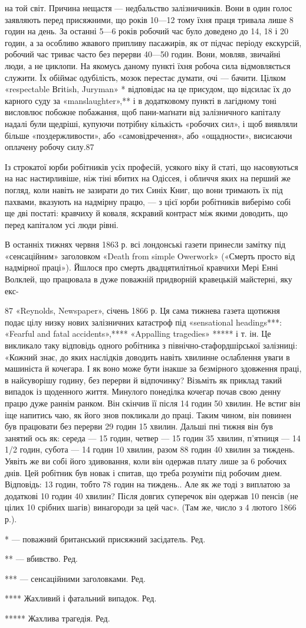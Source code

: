 на той світ. Причина нещастя — недбальство залізничників. Вони
в один голос заявляють перед присяжними, що років 10—12 тому
їхня праця тривала лише 8 годин на день. За останні 5—6 років
робочий час було доведено до 14, 18 і 20 годин, а за особливо
жвавого припливу пасажирів, як от підчас періоду екскурсій,
робочий час триває часто без перерви 40—50 годин. Вони, мовляв,
звичайні люди, а не циклопи. На якомусь даному пункті
їхня робоча сила відмовляється служити. Їх обіймає одубілість,
мозок перестає думати, очі — бачити. Цілком «respectable Вгіtish,
Juryman» * відповідає на це присудом, що відсилає їх до
карного суду за «manslaughter»,** і в додатковому пункті в лагідному
тоні висловлює побожне побажання, щоб пани-маґнати
від залізничного капіталу надалі були щедріші, купуючи потрібну
кількість «робочих сил», і щоб виявляли більше «поздержливости»,
або «самовідречення», або «ощадности», висисаючи
оплачену робочу силу.87

Із строкатої юрби робітників усіх професій, усякого віку й
статі, що насовуються на нас настирливіше, ніж тіні вбитих на
Одіссея, і обличчя яких на перший же погляд, коли навіть не
зазирати до тих Синіх Книг, що вони тримають їх під пахвами,
вказують на надмірну працю, — з цієї юрби робітників виберімо
собі ще дві постаті: кравчиху й коваля, яскравий контраст між
якими доводить, що перед капіталом усі люди рівні.

В останніх тижнях червня 1863 р. всі лондонські газети принесли
замітку під «сенсаційним» заголовком «Death from simple
Owerwork» («Смерть просто від надмірної праці»). Йшлося про
смерть двадцятилітньої кравчихи Мері Енні Волклей, що працювала
в дуже поважній придворній кравецькій майстерні, яку екс-

87 «Reynolds, Newspaper», січень 1866 р. Ця сама тижнева газета щотижня
подає цілу низку нових залізничних катастроф під «sensational headings***:
«Fearful and fatal accidents»,**** «Appalling tragedies» ***** і т. ін.
Це викликало таку відповідь одного робітника з північно-стафордшірської
залізниці: «Кожний знає, до яких наслідків доводить навіть хвилинне
ослаблення уваги в машиніста й кочегара. І як воно може бути інакше
за безмірного здовження праці, в найсуворішу годину, без перерви й відпочинку?
Візьміть як приклад такий випадок із щоденного життя. Минулого
понеділка кочегар почав свою денну працю дуже раннім ранком.
Він скінчив її після 14 годин 50 хвилин. Не встиг він іще напитись чаю,
як його знов покликали до праці. Таким чином, він повинен був працювати
без перерви 29 годин 15 хвилин. Дальші пні тижня він був занятий ось
як: середа — 15 годин, четвер — 15 годин 35 хвилин, п’ятниця — 14 1/2 годин,
субота — 14 годин 10 хвилин, разом 88 годин 40 хвилин за тиждень.
Уявіть же ви собі його здивовання, коли він одержав плату лише за 6 робочих
днів. Цей робітник був новак і спитав, що треба розуміти під робочим
днем. Відповідь: 13 годин, тобто 78 годин на тиждень.. Але як же тоді
з виплатою за додаткові 10 годин 40 хвилин? Після довгих суперечок він
одержав 10 пенсів (не цілих 10 срібних шагів) винагороди за цей час».
(Там же, число з 4 лютого 1866 р.).

* — поважний британський присяжний засідатель. Ред.

** — вбивство. Ред.

*** — сенсаційними заголовками. Ред.

**** Жахливий і фатальний випадок. Ред.

***** Жахлива трагедія. Ред.
